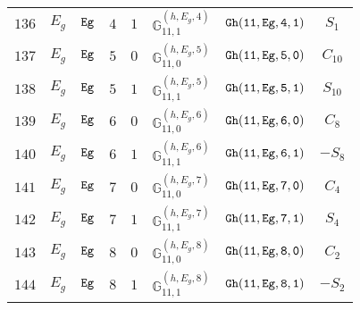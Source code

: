 \documentclass[fleqn,8pt]{jsarticle}
\begin{document}
\begin{table}[ht!]
\begin{center}
\begin{tabular}{cccccccc}
$ 136 $ & $ E_{g} $ & $ {\tt Eg} $ & $ 4 $ & $ 1 $ & $ \mathbb{G}_{11,1}^{(h,E_{g},4)} $ & $ {\tt Gh(11,Eg,4,1)} $ & $ S_{1} $ \\
$ 137 $ & $ E_{g} $ & $ {\tt Eg} $ & $ 5 $ & $ 0 $ & $ \mathbb{G}_{11,0}^{(h,E_{g},5)} $ & $ {\tt Gh(11,Eg,5,0)} $ & $ C_{10} $ \\
$ 138 $ & $ E_{g} $ & $ {\tt Eg} $ & $ 5 $ & $ 1 $ & $ \mathbb{G}_{11,1}^{(h,E_{g},5)} $ & $ {\tt Gh(11,Eg,5,1)} $ & $ S_{10} $ \\
$ 139 $ & $ E_{g} $ & $ {\tt Eg} $ & $ 6 $ & $ 0 $ & $ \mathbb{G}_{11,0}^{(h,E_{g},6)} $ & $ {\tt Gh(11,Eg,6,0)} $ & $ C_{8} $ \\
$ 140 $ & $ E_{g} $ & $ {\tt Eg} $ & $ 6 $ & $ 1 $ & $ \mathbb{G}_{11,1}^{(h,E_{g},6)} $ & $ {\tt Gh(11,Eg,6,1)} $ & $ - S_{8} $ \\
$ 141 $ & $ E_{g} $ & $ {\tt Eg} $ & $ 7 $ & $ 0 $ & $ \mathbb{G}_{11,0}^{(h,E_{g},7)} $ & $ {\tt Gh(11,Eg,7,0)} $ & $ C_{4} $ \\
$ 142 $ & $ E_{g} $ & $ {\tt Eg} $ & $ 7 $ & $ 1 $ & $ \mathbb{G}_{11,1}^{(h,E_{g},7)} $ & $ {\tt Gh(11,Eg,7,1)} $ & $ S_{4} $ \\
$ 143 $ & $ E_{g} $ & $ {\tt Eg} $ & $ 8 $ & $ 0 $ & $ \mathbb{G}_{11,0}^{(h,E_{g},8)} $ & $ {\tt Gh(11,Eg,8,0)} $ & $ C_{2} $ \\
$ 144 $ & $ E_{g} $ & $ {\tt Eg} $ & $ 8 $ & $ 1 $ & $ \mathbb{G}_{11,1}^{(h,E_{g},8)} $ & $ {\tt Gh(11,Eg,8,1)} $ & $ - S_{2} $ \\
 \hline \hline
\end{tabular}
\end{center}
\end{table}
\end{document}
